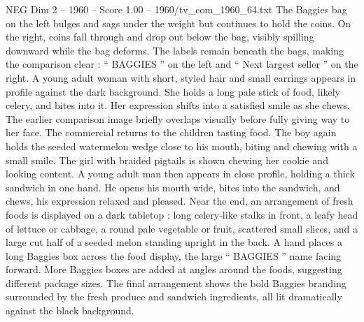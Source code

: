 \begin{textsample}{NEG Dim 2 – 1960 – Score 1.00 – 1960/tv\_com\_1960\_64.txt}
The Baggies bag on the left bulges and sags under the weight but continues to hold the coins.
On the right, coins fall through and drop out below the bag, visibly spilling downward while the bag deforms.
The labels remain beneath the bags, making the comparison clear : “ BAGGIES ” on the left and “ Next largest seller ” on the right.
A young adult woman with short, styled hair and small earrings appears in profile against the dark background.
She holds a long pale stick of food, likely celery, and bites into it.
Her expression shifts into a satisfied smile as she chews.
The earlier comparison image briefly overlaps visually before fully giving way to her face.
The commercial returns to the children tasting food.
The boy again holds the seeded watermelon wedge close to his mouth, biting and chewing with a small smile.
The girl with braided pigtails is shown chewing her cookie and looking content.
A young adult man then appears in close profile, holding a thick sandwich in one hand.
He opens his mouth wide, bites into the sandwich, and chews, his expression relaxed and pleased.
Near the end, an arrangement of fresh foods is displayed on a dark tabletop : long celery-like stalks in front, a leafy head of lettuce or cabbage, a round pale vegetable or fruit, scattered small slices, and a large cut half of a seeded melon standing upright in the back.
A hand places a long Baggies box across the food display, the large “ BAGGIES ” name facing forward.
More Baggies boxes are added at angles around the foods, suggesting different package sizes.
The final arrangement shows the bold Baggies branding surrounded by the fresh produce and sandwich ingredients, all lit dramatically against the black background.

\end{textsample}
